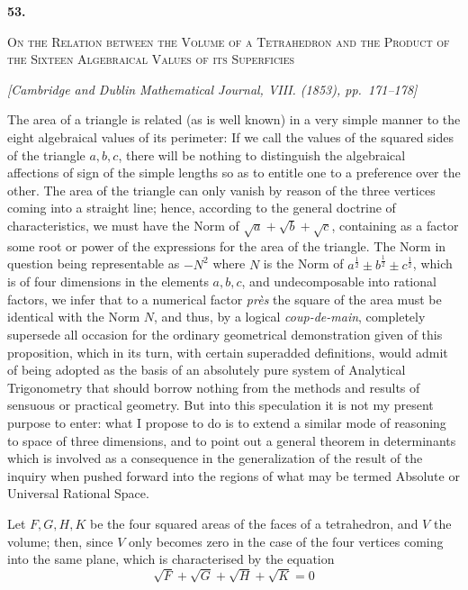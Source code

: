 \documentclass[11pt]{article}
\newcommand{\paperhead}[3]{%
  \clearpage
  \begin{center}
  {\Large\bfseries #1.}\par\vspace{0.85em}
  {\large\scshape #2}\par\vspace{0.6em}
  {\itshape [#3]}\par
  \end{center}\vspace{0.4em}}
\newcommand{\sourcepage}[1]{\marginpar{\scriptsize p.~#1}}
\begin{document}
{{\paperhead{53}{On the Relation between the Volume of a Tetrahedron and the Product of the Sixteen Algebraical Values of its Superficies}{Cambridge and Dublin Mathematical Journal, VIII. (1853), pp.~171--178}

\sourcepage{404}
The area of a triangle is related (as is well known) in a very simple manner to the eight algebraical values of its perimeter: If we call the values of the squared sides of the triangle $a,b,c$, there will be nothing to distinguish the algebraical affections of sign of the simple lengths so as to entitle one to a preference over the other. The area of the triangle can only vanish by reason of the three vertices coming into a straight line; hence, according to the general doctrine of characteristics, we must have the Norm of $\sqrt a+\sqrt b+\sqrt c$, containing as a factor some root or power of the expressions for the area of the triangle. The Norm in question being representable as $-N^2$ where $N$ is the Norm of $a^{\frac12}\pm b^{\frac12}\pm c^{\frac12}$, which is of four dimensions in the elements $a,b,c$, and undecomposable into rational factors, we infer that to a numerical factor \emph{près} the square of the area must be identical with the Norm $N$, and thus, by a logical \emph{coup-de-main}, completely supersede all occasion for the ordinary geometrical demonstration given of this proposition, which in its turn, with certain superadded definitions, would admit of being adopted as the basis of an absolutely pure system of Analytical Trigonometry that should borrow nothing from the methods and results of sensuous or practical geometry. But into this speculation it is not my present purpose to enter: what I propose to do is to extend a similar mode of reasoning to space of three dimensions, and to point out a general theorem in determinants which is involved as a consequence in the generalization of the result of the inquiry when pushed forward into the regions of what may be termed Absolute or Universal Rational Space.

Let $F,G,H,K$ be the four squared areas of the faces of a tetrahedron, and $V$ the volume; then, since $V$ only becomes zero in the case of the four vertices coming into the same plane, which is characterised by the equation
\[
\sqrt F+\sqrt G+\sqrt H+\sqrt K=0
\]

}}
\end{document}
